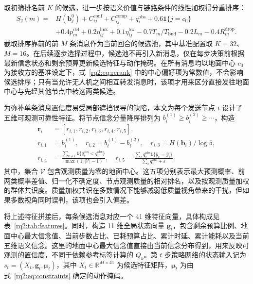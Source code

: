 取初筛排名前 $K$ 的候选，进一步按语义价值与链路条件的线性加权得分重排序：
\begin{equation}
\begin{aligned}
S_2(m)={}&H(\bm b_j^0)+C_{ij}^{\mathrm{conf}}+C_{ij}^{\mathrm{comp}}+q_i^{\mathrm{obs}}
+0.6\mathbf1\{j=c_0\}\\
&+0.4p_m^{\mathrm{del}}+0.2\eta_{ij}^{\mathrm{link}}+0.1\eta_{ij}^{\mathrm{bw}}
-0.7T_m/T_{\mathrm{bud}}-0.2L_m-0.4R_m^{\mathrm{drop}}.
\end{aligned}
\label{rq2:eq:rerank}
\end{equation}
截取排序靠前的前 $M$ 条消息作为当前回合的候选池，其中基准配置取 $K=32$、$M=16$。在后续逐步选择过程中，候选池不再引入新消息，仅在每步决策前根据最新信念状态和剩余预算更新候选特征与动作掩码。在所有消息均以地面中心 $c_0$ 为接收方的基准设定下，式~\eqref{rq2:eq:rerank} 中的中心偏好项为常数值，不会影响候选排序；只有当允许无人机之间相互转发消息时，该项才用来区分直接发往地面中心与先经其他节点中转这两类候选。

为弥补单条消息置信度易受局部遮挡误导的缺陷，本文为每个发送节点 $i$ 设计了五维可观测可靠性特征。将节点信念分量降序排列为 $b_i^{(1)}\geq b_i^{(2)}\geq\cdots$，构造
\begin{equation}
\begin{aligned}
\bm r_i&=[r_{i,1},r_{i,2},r_{i,3},r_{i,4},r_{i,5}],\\
r_{i,1}&=b_i^{(1)},\quad r_{i,2}=b_i^{(1)}-b_i^{(2)},\quad
r_{i,3}=H(\bm b_i)/\log5,\\
r_{i,4}&=\frac{\sum_{v\ne i}\mathbf1\{q_v^{\mathrm{obs}}<q_i^{\mathrm{obs}}\}}{\max(1,|\mathcal V|-1)},\quad
r_{i,5}=\frac{\sum_v q_v^{\mathrm{obs}}\mathbf1\{\hat y_v=\hat y_i\}}{\sum_v q_v^{\mathrm{obs}}+\varepsilon},
\end{aligned}
\label{rq2:eq:reliability}
\end{equation}
其中，集合 $\mathcal V$ 包含观测质量为零的地面中心。这五项分别表示最大预测概率、前两类概率差值、归一化不确定度、节点观测质量的相对排名，以及按观测质量加权的群体共识度。质量加权共识在多数情况下能够减弱低质量视角带来的干扰，但如果多数视角同时误判，该项也会引入偏差。

将上述特征拼接后，每条候选消息对应一个 41 维特征向量，具体构成见表~\ref{rq2:tab:features}。同时，构造 11 维全局状态向量 $\bm g_t$，包含剩余预算比例、地面中心最大信念值、当前步数占比、已耗预算占比、累计时延、累计能耗以及当前五维语义信念。这里的地面中心最大信念值直接由当前信念分布得到，用来反映可观测的置信度，不同于依赖参考标签计算的 $Q_k$。第 $t$ 步策略网络的状态输入记为 $s_t=(X_t,\bm g_t,\bm\mu_t)$，其中 $X_t\in\mathbb R^{M\times41}$ 为候选特征矩阵，$\bm\mu_t$ 为由式~\eqref{rq2:eq:constraints} 确定的动作掩码。

